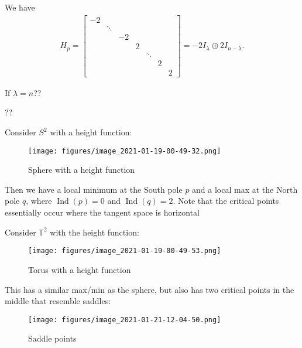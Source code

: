 \begin{remark}[Observation 1]

We have
\begin{align*}
H_p = 
\begin{bmatrix}
-2&&&&&&\\
&\ddots&&&&&\\
&&-2&&&&\\
&&&2&&&\\
&&&&\ddots&&\\
&&&&&2&\\
&&&&&&2
\end{bmatrix}
= -2 I_{\lambda} \oplus 2 I_{n- \lambda}
.\end{align*}

\end{remark}

\begin{remark}[Observation 2]

If \(\lambda=n\)??

\end{remark}

\begin{remark}[Observation 3]

??

\end{remark}

\begin{example}[Sphere]

Consider \(S^2\) with a height function:

\begin{figure}
\centering
\texttt{[image: figures/image\_2021-01-19-00-49-32.png]}
\caption{Sphere with a height function}
\end{figure}

Then we have a local minimum at the South pole \(p\) and a local max at
the North pole \(q\), where \(\mathop{\mathrm{Ind}}(p) = 0\) and
\(\mathop{\mathrm{Ind}}(q) = 2\). Note that the critical points
essentially occur where the tangent space is horizontal

\end{example}

\begin{example}[Torus]

Consider \({\mathbb{T}}^2\) with the height function:

\begin{figure}
\centering
\texttt{[image: figures/image\_2021-01-19-00-49-53.png]}
\caption{Torus with a height function}
\end{figure}

This has a similar max/min as the sphere, but also has two critical
points in the middle that resemble saddles:

\begin{figure}
\centering
\texttt{[image: figures/image\_2021-01-21-12-04-50.png]}
\caption{Saddle points}
\end{figure}

\end{example}

